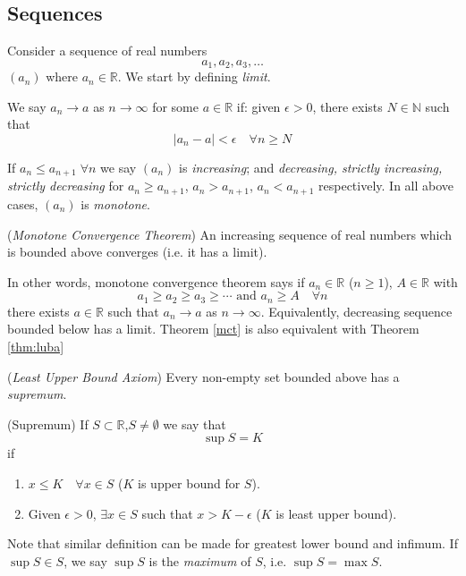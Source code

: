 \documentclass[10pt, a4paper, twoside]{report}
\begin{document}
\subsection{Sequences}
Consider a sequence of real numbers
\[a_1,a_2,a_3,\ldots\]
\((a_n)\) where \(a_n\in\mathbb{R}\).
We start by defining \emph{limit}.
\begin{definition}
    We say \(a_n\to a\) as \(n\to\infty\) for some \(a\in\mathbb{R}\) if: given \(\epsilon>0\), there exists \(N\in\mathbb{N}\) such that
    \[|a_n-a|<\epsilon\quad\forall n\geq N\]
    \label{def:limit}
\end{definition}
If \(a_n\leq a_{n+1}\;\forall n\) we say \((a_n)\) is \emph{increasing}; and \emph{decreasing, strictly increasing, strictly decreasing} for \(a_n\geq a_{n+1}\), \(a_n>a_{n+1}\), \(a_n<a_{n+1}\) respectively. In all above cases, \((a_n)\) is \emph{monotone}.
\begin{theorem}
    (\emph{Monotone Convergence Theorem}) An increasing sequence of real numbers which is bounded above converges (i.e. it has a limit).
    \label{mct}
\end{theorem}
In other words, monotone convergence theorem says if \(a_n\in\mathbb{R}\) (\(n\geq 1\)), \(A\in\mathbb{R}\) with
\[a_1\geq a_2\geq a_3\geq\cdots\text{  and  }a_n\geq A\quad\forall n\]
there exists \(a\in\mathbb{R}\) such that \(a_n\to a\) as \(n\to\infty\). Equivalently, decreasing sequence bounded below has a limit. Theorem \ref{mct} is also equivalent with Theorem \ref{thm:luba}
\begin{theorem}
    (\emph{Least Upper Bound Axiom}) Every non-empty set bounded above has a \emph{supremum}.
    \label{thm:luba}
\end{theorem}
\begin{definition}
    (Supremum) If \(S\subset\mathbb{R}\),\(S\neq\emptyset\) we say that
    \[\sup S=K\]
    if 
    \begin{enumerate}
        \item \(x\leq K\quad\forall x\in S\) (\(K\) is upper bound for \(S\)).
        \item Given \(\epsilon>0\), \(\exists x\in S\) such that \(x>K-\epsilon\) (\(K\) is least upper bound).
    \end{enumerate}
    \label{def:sup}
\end{definition}
Note that similar definition can be made for greatest lower bound and infimum. If \(\sup S\in S\), we say \(\sup S\) is the \emph{maximum} of \(S\), i.e. \(\sup S=\max S\).
\end{document}
